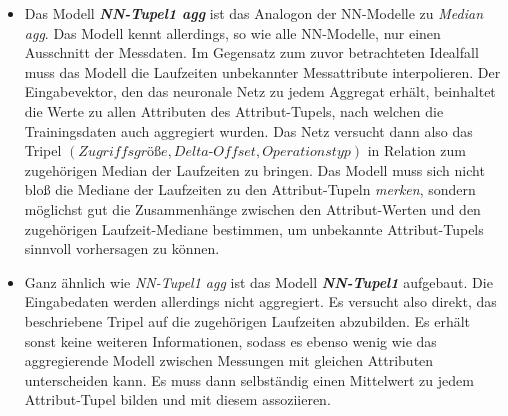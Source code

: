 \documentclass[
	12pt,
	a4paper,
	BCOR10mm,
	DIV14,
	listof=totoc,
	bibliography=totoc,
	headsepline
]{scrreprt}
\begin{document}
\begin{itemize}
	\item Das Modell \textit{\textbf{NN-Tupel1 agg}} ist das Analogon der NN-Modelle zu \textit{Median agg}. Das Modell kennt allerdings, so wie alle NN-Modelle, nur einen Ausschnitt der Messdaten.
	Im Gegensatz zum zuvor betrachteten Idealfall muss das Modell die Laufzeiten unbekannter Messattribute interpolieren.
	Der Eingabevektor, den das neuronale Netz zu jedem Aggregat erhält, beinhaltet die Werte zu allen Attributen des Attribut-Tupels, nach welchen die Trainingsdaten auch aggregiert wurden.
	Das Netz versucht dann also das Tripel $(Zugriffsgrö\text{ß}e, Delta\text{-}Offset, Operationstyp)$ in Relation zum zugehörigen Median der Laufzeiten zu bringen.
	Das Modell muss sich nicht bloß die Mediane der Laufzeiten zu den Attribut-Tupeln \textit{merken}, sondern möglichst gut die Zusammenhänge zwischen den Attribut-Werten und den zugehörigen Laufzeit-Mediane bestimmen, um unbekannte Attribut-Tupels sinnvoll vorhersagen zu können.
	\item Ganz ähnlich wie \textit{NN-Tupel1 agg} ist das Modell \textit{\textbf{NN-Tupel1}} aufgebaut. Die Eingabedaten werden allerdings nicht aggregiert.
	Es versucht also direkt, das beschriebene Tripel auf die zugehörigen Laufzeiten abzubilden. Es erhält sonst keine weiteren Informationen, sodass es ebenso wenig wie das aggregierende Modell zwischen Messungen mit gleichen Attributen unterscheiden kann.
	Es muss dann selbständig einen Mittelwert zu jedem Attribut-Tupel bilden und mit diesem assoziieren.
\end{itemize}
\end{document}
